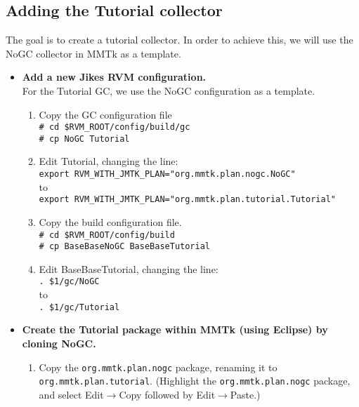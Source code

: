 \documentclass[textsize=14pt]{article}
\newcommand{\cmd}[1]{\texttt{\# #1}}
\newcommand{\shline}[1]{\texttt{#1}}
\newcommand{\code}[1]{\texttt{#1}}
\newcommand{\file}[1]{\textsf{#1}}
\newcommand{\menu}[0]{$\rightarrow$}
\begin{document}
\subsection{Adding the Tutorial collector}

The goal is to create a tutorial collector. In order to achieve
this, we will use the NoGC collector in MMTk as a template.

\begin{itemize}
\item \textbf{Add a new Jikes RVM configuration.} \\
    For the Tutorial GC, we use the NoGC configuration as a
    template.
    \begin{enumerate}
    \item Copy the GC configuration file \\
    \cmd{cd \$RVM\_ROOT/config/build/gc} \\
    \cmd{cp NoGC Tutorial}

    \item Edit \file{Tutorial}, changing the line: \\
    \shline{export RVM\_WITH\_JMTK\_PLAN="org.mmtk.plan.nogc.NoGC"} \\ to \\
    \shline{export RVM\_WITH\_JMTK\_PLAN="org.mmtk.plan.tutorial.Tutorial"}

    \item Copy the build configuration file. \\
    \cmd{cd \$RVM\_ROOT/config/build} \\
    \cmd{cp BaseBaseNoGC BaseBaseTutorial}

    \item Edit \file{BaseBaseTutorial}, changing the line: \\
    \shline{. \$1/gc/NoGC} \\ to \\
    \shline{. \$1/gc/Tutorial}

    \end{enumerate}

\item \textbf{Create the Tutorial package within MMTk (using Eclipse) by cloning NoGC.}
    \begin{enumerate}
    \item Copy the \code{org.mmtk.plan.nogc} package, renaming it to
    \code{org.mmtk.plan.tutorial}. (Highlight the \code{org.mmtk.plan.nogc} package, and
    select Edit\menu{}Copy followed by Edit\menu{}Paste.)


\end{enumerate}
\end{itemize}
\end{document}
